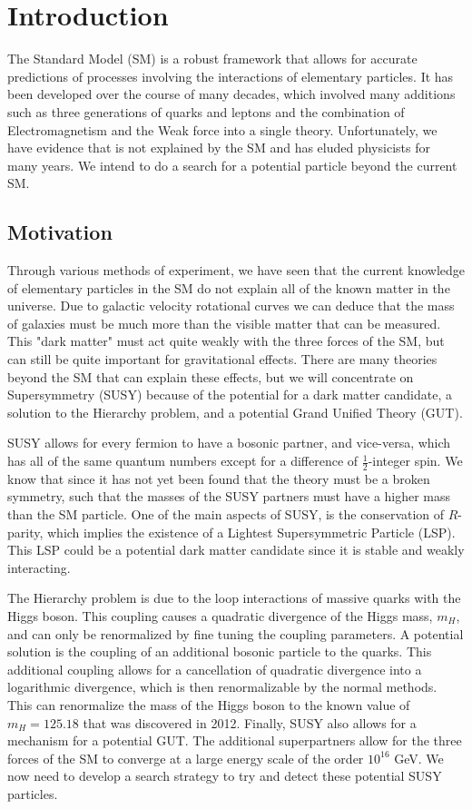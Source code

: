 \chapter{Introduction}
\label{ch:Intro}

The Standard Model (SM) is a robust framework that allows for accurate predictions of processes involving the interactions of elementary particles. It has been developed over the course of many decades, which involved many additions such as three generations of quarks and leptons and the combination of Electromagnetism and the Weak force into a single theory. Unfortunately, we have evidence that is not explained by the SM and has eluded physicists for many years. We intend to do a search for a potential particle beyond the current SM.

\section{Motivation}
\label{sec:Motivation}

Through various methods of experiment, we have seen that the current knowledge of elementary particles in the SM do not explain all of the known matter in the universe. Due to galactic velocity rotational curves we can deduce that the mass of galaxies must be much more than the visible matter that can be measured. This "dark matter" must act quite weakly with the three forces of the SM, but can still be quite important for gravitational effects. There are many theories beyond the SM that can explain these effects, but we will concentrate on Supersymmetry (SUSY) because of the potential for a dark matter candidate, a solution to the Hierarchy problem, and a potential Grand Unified Theory (GUT).

SUSY allows for every fermion to have a bosonic partner, and vice-versa, which has all of the same quantum numbers except for a difference of $\frac{1}{2}$-integer spin. We know that since it has not yet been found that the theory must be a broken symmetry, such that the masses of the SUSY partners must have a higher mass than the SM particle. One of the main aspects of SUSY, is the conservation of $R$-parity, which implies the existence of a Lightest Supersymmetric Particle (LSP). This LSP could be a potential dark matter candidate since it is stable and weakly interacting. 

The Hierarchy problem is due to the loop interactions of massive quarks with the Higgs boson. This coupling causes a quadratic divergence of the Higgs mass, $m_H$, and can only be renormalized by fine tuning the coupling parameters. A potential solution is the coupling of an additional bosonic particle to the quarks. This additional coupling allows for a cancellation of quadratic divergence into a logarithmic divergence, which is then renormalizable by the normal methods. This can renormalize the mass of the Higgs boson to the known value of $m_H=125.18$ \GeV{} that was discovered in 2012. Finally, SUSY also allows for a mechanism for a potential GUT. The additional superpartners allow for the three forces of the SM to converge at a large energy scale of the order $10^{16}$ GeV. We now need to develop a search strategy to try and detect these potential SUSY particles.

